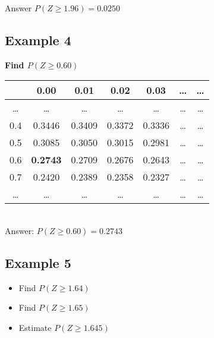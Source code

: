 \documentclass[a4paper,12pt]{article}
\begin{document}
Answer $P(Z \geq 1.96)  = 0.0250$

\newpage
\subsection*{Example 4}
\noindent \textbf{Find $ P(Z \geq 0.60)$}
{
\begin{table}[ht]
\centering %
\begin{tabular}{|c|| c c c c c c|} %
\hline %
& 0.00 & 0.01 & 0.02 &0.03&\ldots&\ldots \\
\hline \hline%
\ldots & \ldots &\ldots &\ldots& \ldots &\ldots&\ldots \\ %
0.4 & 0.3446 & 0.3409&0.3372 & 0.3336 &\ldots&\ldots\\
0.5 & 0.3085 & 0.3050 &0.3015& 0.2981 &\ldots&\dots \\ %
0.6 & \textbf{0.2743} & 0.2709&0.2676 & 0.2643 &\ldots&\ldots\\
0.7 & 0.2420 & 0.2389 &0.2358& 0.2327 &\ldots&\dots \\ %
\ldots & \ldots &\ldots &\ldots& \ldots &\ldots&\ldots \\ %
\hline %
\end{tabular}
\end{table}
} \\
\noindent Answer: $ P(Z \geq 0.60) = 0.2743$
\subsection*{Example 5}

\begin{itemize}
\item Find $ P(Z \geq 1.64)$
\item Find $ P(Z \geq 1.65)$
\item Estimate $P( Z \geq 1.645)$
\end{itemize}
\end{document}
